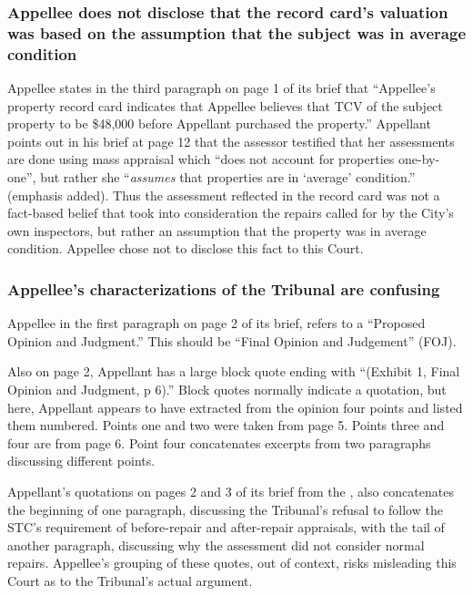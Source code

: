 \documentclass[12pt,\documentclassflag]{michiganCourtOfAppealsBrief}
\begin{document}
\subsubsection{Appellee does not disclose that the record card's valuation was based on the assumption that the subject was in average condition}

Appellee states in the third paragraph on page 1 of its brief that ``Appellee's property record card indicates that Appellee believes that TCV of the subject property to be \$48,000 before Appellant purchased the property.'' Appellant points out in his brief at page 12 that the assessor testified that her assessments are done using mass appraisal which ``does not account for properties one-by-one'', but rather she ``{\em assumes} that properties are in `average' condition.'' \foj[4] (emphasis added). Thus the assessment reflected in the record card was not a fact-based belief that took into consideration the repairs called for by the City's own inspectors, but rather an assumption that the property was in average condition. Appellee chose not to disclose this fact to this Court.

\subsubsection{Appellee's characterizations of the Tribunal are confusing}

Appellee in the first paragraph on page 2 of its brief, refers to a ``Proposed Opinion and Judgment.'' This should be ``Final Opinion and Judgement'' (FOJ).

Also on page 2, Appellant has a large block quote ending with ``(Exhibit 1, Final Opinion and Judgment, p 6).'' Block quotes normally indicate a quotation, but here, Appellant appears to have extracted from the opinion four points and listed them numbered. Points one and two were taken from page 5. Points three and four are from page 6. Point four concatenates excerpts from two paragraphs discussing different points.

Appellant's quotations on pages 2 and 3 of its brief from the \reconsiderationDenied[2], also concatenates the beginning of one paragraph, discussing the Tribunal's refusal to follow the STC's requirement of before-repair and after-repair appraisals, with the tail of another paragraph, discussing why the assessment did not consider normal repairs. Appellee's grouping of these quotes, out of context, risks misleading this Court as to the Tribunal's actual argument. %
\end{document}
